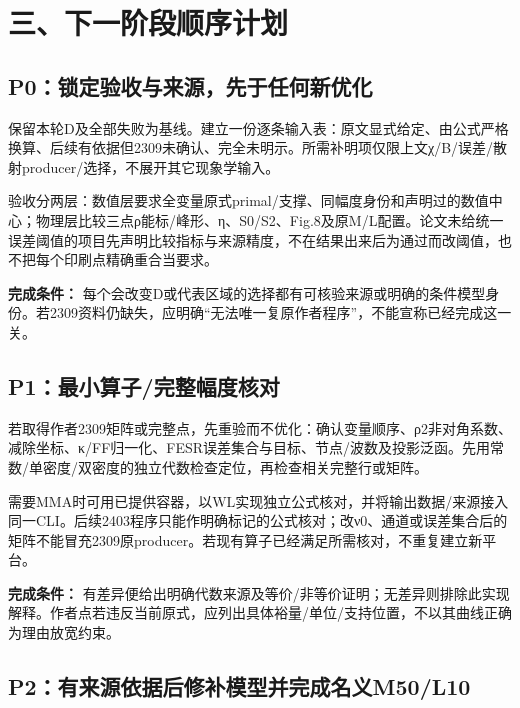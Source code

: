 \documentclass[
  10pt,
  a4paper,
]{article}
\begin{document}
\section{三、下一阶段顺序计划}\label{ux4e09ux4e0bux4e00ux9636ux6bb5ux987aux5e8fux8ba1ux5212}

\subsection{P0：锁定验收与来源，先于任何新优化}\label{p0ux9501ux5b9aux9a8cux6536ux4e0eux6765ux6e90ux5148ux4e8eux4efbux4f55ux65b0ux4f18ux5316}

保留本轮D及全部失败为基线。建立一份逐条输入表：原文显式给定、由公式严格换算、后续有依据但2309未确认、完全未明示。所需补明项仅限上文χ/B/误差/散射producer/选择，不展开其它现象学输入。

验收分两层：数值层要求全变量原式primal/支撑、同幅度身份和声明过的数值中心；物理层比较三点ρ能标/峰形、η、S0/S2、Fig.8及原M/L配置。论文未给统一误差阈值的项目先声明比较指标与来源精度，不在结果出来后为通过而改阈值，也不把每个印刷点精确重合当要求。

\textbf{完成条件：}
每个会改变D或代表区域的选择都有可核验来源或明确的条件模型身份。若2309资料仍缺失，应明确``无法唯一复原作者程序''，不能宣称已经完成这一关。

\subsection{P1：最小算子/完整幅度核对}\label{p1ux6700ux5c0fux7b97ux5b50ux5b8cux6574ux5e45ux5ea6ux6838ux5bf9}

若取得作者2309矩阵或完整点，先重验而不优化：确认变量顺序、ρ2非对角系数、减除坐标、κ/FF归一化、FESR误差集合与目标、节点/波数及投影泛函。先用常数/单密度/双密度的独立代数检查定位，再检查相关完整行或矩阵。

需要MMA时可用已提供容器，以WL实现独立公式核对，并将输出数据/来源接入同一CLI。后续2403程序只能作明确标记的公式核对；改ν0、通道或误差集合后的矩阵不能冒充2309原producer。若现有算子已经满足所需核对，不重复建立新平台。

\textbf{完成条件：}
有差异便给出明确代数来源及等价/非等价证明；无差异则排除此实现解释。作者点若违反当前原式，应列出具体裕量/单位/支持位置，不以其曲线正确为理由放宽约束。

\subsection{P2：有来源依据后修补模型并完成名义M50/L10}\label{p2ux6709ux6765ux6e90ux4f9dux636eux540eux4feeux8865ux6a21ux578bux5e76ux5b8cux6210ux540dux4e49m50l10}
\end{document}
